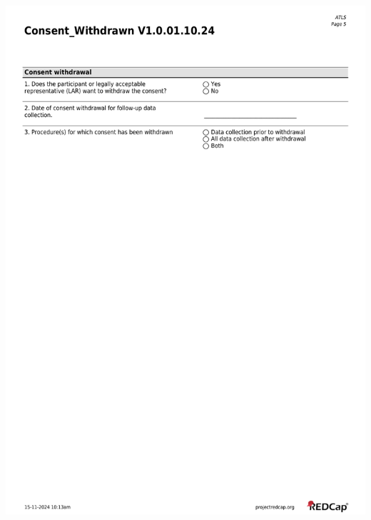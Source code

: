 \documentclass[
]{scrartcl}
\begin{document}
\includegraphics{../case-record-form/instrument-pdfs/pages/all-instruments-5.pdf}
\end{document}
